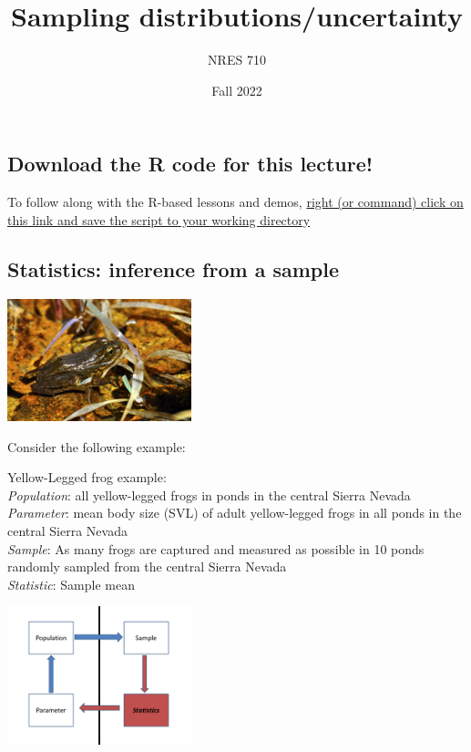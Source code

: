 \documentclass[
]{article}
\title{Sampling distributions/uncertainty}
\author{NRES 710}
\date{Fall 2022}
\begin{document}
\maketitle

\hypertarget{download-the-r-code-for-this-lecture}{%
\subsection{Download the R code for this
lecture!}\label{download-the-r-code-for-this-lecture}}

To follow along with the R-based lessons and demos,
\href{LECTURE2.R}{right (or command) click on this link and save the
script to your working directory}

\hypertarget{statistics-inference-from-a-sample}{%
\subsection{Statistics: inference from a
sample}\label{statistics-inference-from-a-sample}}

\includegraphics[width=0.4\textwidth,height=\textheight]{ylf.jpg}

Consider the following example:

Yellow-Legged frog example:\\
\emph{Population}: all yellow-legged frogs in ponds in the central
Sierra Nevada\\
\emph{Parameter}: mean body size (SVL) of adult yellow-legged frogs in
all ponds in the central Sierra Nevada\\
\emph{Sample}: As many frogs are captured and measured as possible in 10
ponds randomly sampled from the central Sierra Nevada\\
\emph{Statistic}: Sample mean

\includegraphics[width=0.4\textwidth,height=\textheight]{statistics1.png}
\end{document}
